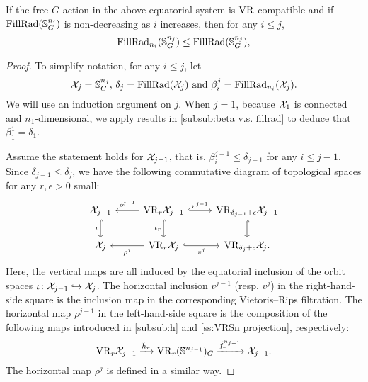 \medskip\lemma If the free \(G\)-action in the above equatorial system is \(\mathrm{VR}\)-compatible and if $\operatorname{FillRad}(\mathbb{S}^{n_i}_G)$ is non-decreasing as \(i\) increases, then for any \(i \leq j\),
\[
\operatorname{FillRad}_{n_i}(\mathbb{S}^{n_j}_G) \leq \operatorname{FillRad}(\mathbb{S}^{n_j}_G),
\]

\begin{proof}
    To simplify notation, for any $i \leq j$, let
    \[
        \mathcal{X}_j = \mathbb{S}^{n_j}_G, \,\delta_j = \operatorname{FillRad}(\mathcal{X}_j) \text{ and }\beta_i^j = \operatorname{FillRad}_{n_i}(\mathcal{X}_j).
    \]
	We will use an induction argument on $j$.
	When $j = 1$, because $\mathcal{X}_1$ is connected and $n_1$-dimensional, we apply results in \cref{subsub:beta v.s. fillrad} to deduce that $\beta_1^1 = \delta_1$.

	Assume the statement holds for $\mathcal{X}_{j-1}$, that is, $\beta_i^{j-1} \leq \delta_{j-1}$ for any $i \leq j-1$.
	Since $\delta_{j-1} \leq \delta_j$, we have the following commutative diagram of topological spaces for any $r,\epsilon>0$ small:
    \begin{equation}\label{d:fundamental_bars_diagram}
        \begin{tikzcd}
            \cX_{j-1}
            \ar[d, hook,"{\iota}" left]
            &
            \VR_r\cX_{j-1}
            \ar[d, hook,"\iota_r" left]
            \ar[l, "\rho^{j-1}" above]
            \ar[r, hook, "v^{j-1}"]
            &
            \VR_{\delta_{j-1}+\epsilon}\cX_{j-1}
            \ar[d, hook]
            \\
            \cX_j
            &
            \VR_r\cX_j
            \ar[l, "\rho^j" below]
            \ar[r, hook, "v^j" below]
            &
            \VR_{\delta_j+\epsilon}\cX_j.
        \end{tikzcd}
    \end{equation}
    Here, the vertical maps are all induced by the equatorial inclusion of the orbit spaces $\iota \colon \mathcal{X}_{j-1} \hookrightarrow \mathcal{X}_j$.
    The horizontal inclusion $v^{j-1}$ (resp. $v^j$) in the right-hand-side square is the inclusion map in the corresponding Vietoris--Rips filtration.
    The horizontal map $\rho^{j-1}$ in the left-hand-side square is the composition of the following maps introduced in \cref{subsub:h} and \cref{ss:VRSn projection}, respectively:
    \[\mathrm{VR}_r\mathcal{X}_{j-1} \xrightarrow{\tilde{h}_r}\mathrm{VR}_r(\mathbb{S}^{n_{j-1}})_G \xrightarrow{\tilde{f}_r^{n_{j-1}}} \mathcal{X}_{j-1}.\]
    The horizontal map $\rho^j$ is defined in a similar way.


\end{proof}
